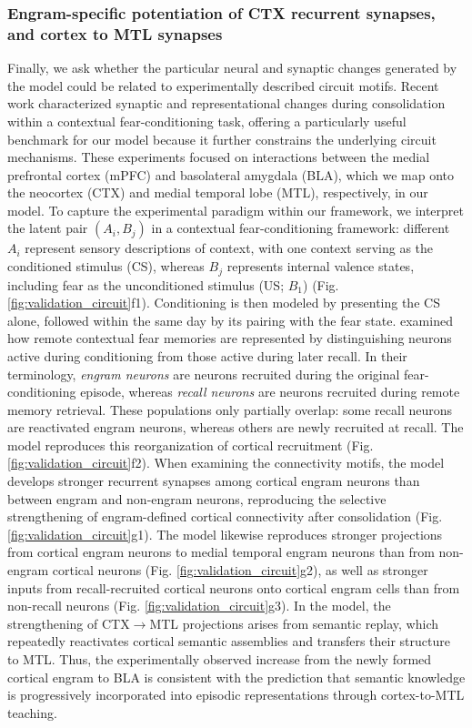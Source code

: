 \documentclass{article}
\begin{document}
\subsubsection*{Engram-specific potentiation of CTX recurrent synapses, and cortex to MTL synapses}
Finally, we ask whether the particular neural and synaptic changes generated by the model could be related to experimentally described circuit motifs. Recent work  characterized synaptic and representational changes during consolidation within a contextual fear-conditioning task, offering a particularly useful benchmark for our model because it further constrains the underlying circuit mechanisms. These experiments focused on interactions between the medial prefrontal cortex (mPFC) and basolateral amygdala (BLA), which we map onto the neocortex (CTX) and medial temporal lobe (MTL), respectively, in our model. To capture the experimental paradigm within our framework, we interpret the latent pair $(A_i,B_j)$ in a contextual fear-conditioning framework: different $A_i$ represent sensory descriptions of context, with one context serving as the conditioned stimulus (CS), whereas $B_j$ represents internal valence states, including fear as the unconditioned stimulus (US; $B_1$) (Fig. \ref{fig:validation_circuit}f1). Conditioning is then modeled by presenting the CS alone, followed within the same day by its pairing with the fear state.
\newline\newline
{} examined how remote contextual fear memories are represented by distinguishing neurons active during conditioning from those active during later recall. In their terminology, \emph{engram neurons} are neurons recruited during the original fear-conditioning episode, whereas \emph{recall neurons} are neurons recruited during remote memory retrieval. These populations only partially overlap: some recall neurons are reactivated engram neurons, whereas others are newly recruited at recall. The model reproduces this reorganization of cortical recruitment (Fig. \ref{fig:validation_circuit}f2).
\newline\newline
When examining the connectivity motifs, the model develops stronger recurrent synapses among cortical engram neurons than between engram and non-engram neurons, reproducing the selective strengthening of engram-defined cortical connectivity after consolidation (Fig. \ref{fig:validation_circuit}g1). The model likewise reproduces stronger projections from cortical engram neurons to medial temporal engram neurons than from non-engram cortical neurons (Fig. \ref{fig:validation_circuit}g2), as well as stronger inputs from recall-recruited cortical neurons onto cortical engram cells than from non-recall neurons (Fig. \ref{fig:validation_circuit}g3). In the model, the strengthening of CTX$\rightarrow$MTL projections arises from semantic replay, which repeatedly reactivates cortical semantic assemblies and transfers their structure to MTL. Thus, the experimentally observed increase from the newly formed cortical engram to BLA is consistent with the prediction that semantic knowledge is progressively incorporated into episodic representations through cortex-to-MTL teaching.
\end{document}
